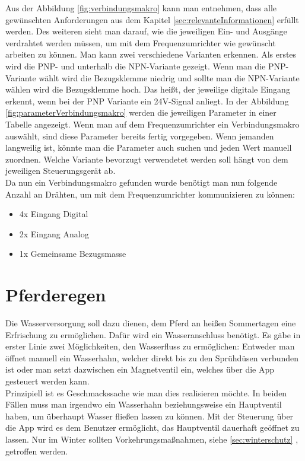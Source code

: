 Aus der Abbildung \ref{fig:verbindungsmakro} kann man entnehmen, dass alle gewünschten Anforderungen aus dem Kapitel \ref{sec:relevanteInformationen} erfüllt werden. Des weiteren sieht man darauf, wie die jeweiligen Ein- und Ausgänge verdrahtet werden müssen, um mit dem Frequenzumrichter wie gewünscht arbeiten zu können. Man kann zwei verschiedene Varianten erkennen. Als erstes wird die PNP- und unterhalb die NPN-Variante gezeigt. Wenn man die PNP-Variante wählt wird die Bezugsklemme niedrig und sollte man die NPN-Variante wählen wird die Bezugsklemme hoch. Das heißt, der jeweilige digitale Eingang erkennt, wenn bei der PNP Variante ein 24V-Signal anliegt. In der Abbildung \ref{fig:parameterVerbindungsmakro} werden die jeweiligen Parameter in einer Tabelle angezeigt. Wenn man auf dem Frequenzumrichter ein Verbindungsmakro auswählt, sind diese Parameter bereits fertig vorgegeben. Wenn jemanden langweilig ist, könnte man die Parameter auch suchen und jeden Wert manuell zuordnen. Welche Variante bevorzugt verwendetet werden soll hängt von dem jeweiligen Steuerungsgerät ab. \\

Da nun ein Verbindungsmakro gefunden wurde benötigt man nun folgende Anzahl an Drähten, um mit dem Frequenzumrichter kommunizieren zu können:

\begin{itemize}
	\item{4x Eingang Digital}
	\item{2x Eingang Analog}
	\item{1x Gemeinsame Bezugsmasse}
\end{itemize}

\newpage
\section{Pferderegen}
\label{sec:pferderegen}

Die Wasserversorgung soll dazu dienen, dem Pferd an heißen Sommertagen eine Erfrischung zu ermöglichen. Dafür wird ein Wasseranschluss benötigt. Es gäbe in erster Linie zwei Möglichkeiten, den Wasserfluss zu ermöglichen: Entweder man öffnet manuell ein Wasserhahn, welcher direkt bis zu den Sprühdüsen verbunden ist oder man setzt dazwischen ein Magnetventil ein, welches über die App gesteuert werden kann. \\
Prinzipiell ist es Geschmackssache wie man dies realisieren möchte. In beiden Fällen muss man irgendwo ein Wasserhahn beziehungsweise ein Hauptventil haben, um überhaupt Wasser fließen lassen zu können. 
Mit der Steuerung über die App wird es dem Benutzer ermöglicht, das Hauptventil dauerhaft geöffnet zu lassen. Nur im Winter sollten 
Vorkehrungsmaßnahmen, siehe \ref{sec:winterschutz} , getroffen werden. 


